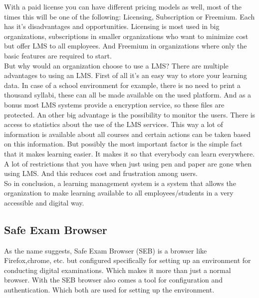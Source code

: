With a paid license you can have different pricing models as well, most of the times this will be one of the following: Licensing, Subscription or Freemium. Each has it's disadvantages and opportunities. Licensing is most used in big organizations, subscriptions in smaller organizations who want to minimize cost but offer LMS to all employees. And Freemium in organizations where only the basic features are required to start.\\

But why would an organization choose to use a LMS? There are multiple advantages to using an LMS. First of all it's an easy way to store your learning data. In case of a school environment for example, there is no need to print a thousand syllabi, these can all be made available on the used platform. And as a bonus most LMS systems provide a encryption service, so these files are protected. An other big advantage is the possibility to monitor the users. There is access to statistics about the use of the LMS services. This way a lot of information is available about all courses and certain actions can be taken based on this information.
But possibly the most important factor is the simple fact that it makes learning easier. It makes it so that everybody can learn everywhere. A lot of restrictions that you have when just using pen and paper are gone when using LMS. And this reduces cost and frustration among users.\\

So in conclusion, a learning management system is a system that allows the organization to make learning available to all employees/students in a very accessible and digital way.

\subsection{Safe Exam Browser}
As the name suggests, Safe Exam Browser (SEB)  is a browser like Firefox,chrome, etc. but configured specifically for setting up an environment for conducting digital examinations. Which makes it more than just a normal browser. With the SEB browser also comes a tool for configuration and authentication. Which both are used for setting up the environment.\\

